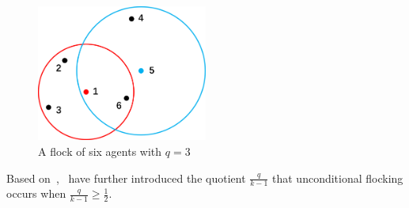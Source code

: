 \begin{figure}[htb]
  \centering
  \includegraphics[width=0.5\textwidth]{figure/chapter_2/knn.png}
  \caption{A flock of six agents with $q=3$}
  \label{fig:knn}
\end{figure}

\noindent
Based on~\cite{KNN},~\cite{CuckerDong2016} have further introduced the quotient $\frac{q}{k-1}$ that unconditional flocking occurs when $\frac{q}{k-1}\geq\frac{1}{2}$.

\newpage

